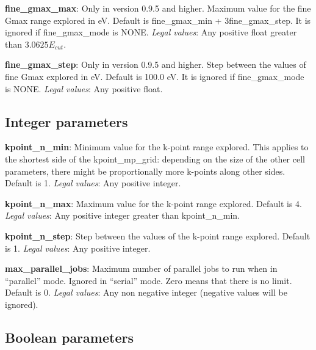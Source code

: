 \documentclass[10pt]{article}
\begin{document}
\textbf{fine\_gmax\_max}: Only in version 0.9.5 and higher. Maximum value for the fine Gmax range explored in eV. Default 
is fine\_gmax\_min + 3fine\_gmax\_step. It is ignored if fine\_gmax\_mode is NONE.\newline
\textit{Legal values}: Any positive float greater than $3.0625E_{cut}$.\newline

\textbf{fine\_gmax\_step}: Only in version 0.9.5 and higher. Step between the values of fine Gmax explored in 
eV. Default is 100.0 eV. It is ignored if fine\_gmax\_mode is NONE.\newline
\textit{Legal values}: Any positive float.\newline

\subsection{Integer parameters}

\textbf{kpoint\_n\_min}: Minimum value for the k-point range explored. This 
applies to the shortest side of the kpoint\_mp\_grid: depending on the size of 
the other cell parameters, there might be proportionally more k-points along 
other sides. Default is 1.\newline
\textit{Legal values}: Any positive integer.\newline

\textbf{kpoint\_n\_max}: Maximum value for the k-point range explored. Default 
is 4.\newline
\textit{Legal values}: Any positive integer greater than kpoint\_n\_min.\newline

\textbf{kpoint\_n\_step}: Step between the values of the k-point range explored. 
Default is 1.\newline
\textit{Legal values}: Any positive integer.\newline

\textbf{max\_parallel\_jobs}: Maximum number of parallel jobs to run when in 
``parallel'' mode. Ignored in ``serial'' mode. Zero means that there is no 
limit. Default is 0.\newline
\textit{Legal values}: Any non negative integer (negative values will be 
ignored).\newline

\subsection{Boolean parameters}
\end{document}
